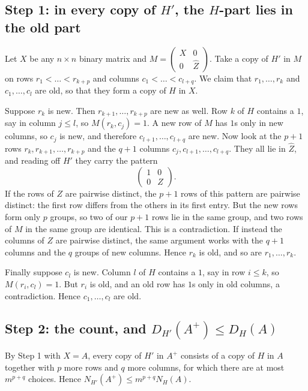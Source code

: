 \documentclass[11pt]{article}
\theoremstyle{plain}
\theoremstyle{definition}
\theoremstyle{remark}
\begin{document}
\subsection*{Step 1: in every copy of $H'$, the $H$-part lies in the old part}

Let $X$ be any $n \times n$ binary matrix and
$M = \begin{pmatrix} X & 0 \\ 0 & \widehat{Z} \end{pmatrix}$. Take a copy of $H'$ in $M$ on rows
$r_1 < \dots < r_{k+p}$ and columns $c_1 < \dots < c_{l+q}$. We claim that
$r_1, \dots, r_k$ and $c_1, \dots, c_l$ are old, so that they form a copy of $H$ in $X$.

Suppose $r_k$ is new. Then $r_{k+1}, \dots, r_{k+p}$ are new as well. Row $k$ of $H$ contains a
$1$, say in column $j \le l$, so $M(r_k, c_j) = 1$. A new row of $M$ has $1$s only in new
columns, so $c_j$ is new, and therefore $c_{l+1}, \dots, c_{l+q}$ are new. Now look at the $p+1$
rows $r_k, r_{k+1}, \dots, r_{k+p}$ and the $q+1$ columns $c_j, c_{l+1}, \dots, c_{l+q}$. They
all lie in $\widehat{Z}$, and reading off $H'$ they carry the pattern
\[
\begin{pmatrix} 1 & 0 \\ 0 & Z \end{pmatrix}.
\]
If the rows of $Z$ are pairwise distinct, the $p+1$ rows of this pattern are pairwise distinct:
the first row differs from the others in its first entry. But the new rows form only $p$
groups, so two of our $p+1$ rows lie in the same group, and two rows of $M$ in the same group
are identical. This is a contradiction. If instead the columns of $Z$ are pairwise distinct, the
same argument works with the $q+1$ columns and the $q$ groups of new columns. Hence $r_k$ is
old, and so are $r_1, \dots, r_k$.

Finally suppose $c_l$ is new. Column $l$ of $H$ contains a $1$, say in row $i \le k$, so
$M(r_i, c_l) = 1$. But $r_i$ is old, and an old row has $1$s only in old columns, a
contradiction. Hence $c_1, \dots, c_l$ are old.

\subsection*{Step 2: the count, and $D_{H'}(A^+) \le D_H(A)$}

By Step 1 with $X = A$, every copy of $H'$ in $A^+$ consists of a copy of $H$ in $A$ together
with $p$ more rows and $q$ more columns, for which there are at most $m^{p+q}$ choices. Hence
$N_{H'}(A^+) \le m^{p+q} N_H(A)$.
\end{document}
